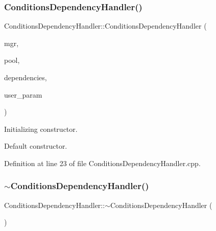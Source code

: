 \subsubsection{\texorpdfstring{Conditions\+Dependency\+Handler()}{ConditionsDependencyHandler()}}
{\footnotesize\ttfamily Conditions\+Dependency\+Handler\+::\+Conditions\+Dependency\+Handler (\begin{DoxyParamCaption}\item[{\hyperlink{class_d_d4hep_1_1_conditions_1_1_conditions_manager_ae865f49d144d8ba5be9eec3e1d8fec94}{Conditions\+Manager\+::\+Object} $\ast$}]{mgr,  }\item[{\hyperlink{class_d_d4hep_1_1_conditions_1_1_user_pool}{User\+Pool} \&}]{pool,  }\item[{const \hyperlink{class_d_d4hep_1_1_conditions_1_1_conditions_dependency_handler_a4a063b30ffccb0e30f3302f1537aef10}{Dependencies} \&}]{dependencies,  }\item[{void $\ast$}]{user\+\_\+param }\end{DoxyParamCaption})}



Initializing constructor. 

Default constructor. 

Definition at line 23 of file Conditions\+Dependency\+Handler.\+cpp.

\hypertarget{class_d_d4hep_1_1_conditions_1_1_conditions_dependency_handler_ae67007fc5c43f4ad2092cca1c6247d78}{}\label{class_d_d4hep_1_1_conditions_1_1_conditions_dependency_handler_ae67007fc5c43f4ad2092cca1c6247d78} 
\subsubsection{\texorpdfstring{$\sim$\+Conditions\+Dependency\+Handler()}{~ConditionsDependencyHandler()}}
{\footnotesize\ttfamily Conditions\+Dependency\+Handler\+::$\sim$\+Conditions\+Dependency\+Handler (\begin{DoxyParamCaption}{ }\end{DoxyParamCaption})}



